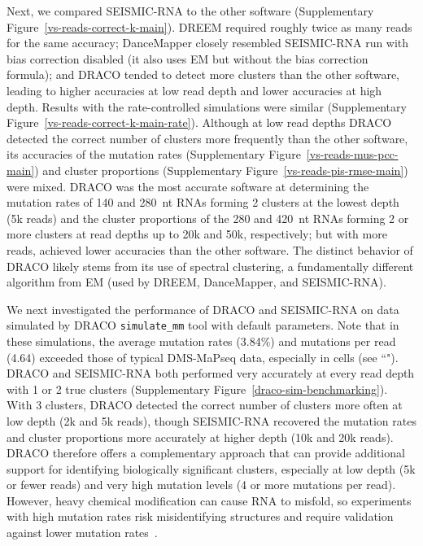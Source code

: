 \documentclass[unnumsec,webpdf,contemporary,large]{oup-authoring-template}%
\theoremstyle{thmstyleone}%
\theoremstyle{thmstyletwo}%
\theoremstyle{thmstylethree}%
\begin{document}
Next, we compared SEISMIC-RNA to the other software (Supplementary Figure~\ref{vs-reads-correct-k-main}).
DREEM required roughly twice as many reads for the same accuracy; DanceMapper closely resembled SEISMIC-RNA run with bias correction disabled (it also uses EM but without the bias correction formula); and DRACO tended to detect more clusters than the other software, leading to higher accuracies at low read depth and lower accuracies at high depth.
Results with the rate-controlled simulations were similar (Supplementary Figure~\ref{vs-reads-correct-k-main-rate}).
Although at low read depths DRACO detected the correct number of clusters more frequently than the other software, its accuracies of the mutation rates (Supplementary Figure~\ref{vs-reads-mus-pcc-main}) and cluster proportions (Supplementary Figure~\ref{vs-reads-pis-rmse-main}) were mixed.
DRACO was the most accurate software at determining the mutation rates of 140 and 280~nt RNAs forming 2 clusters at the lowest depth (5k reads) and the cluster proportions of the 280 and 420~nt RNAs forming 2 or more clusters at read depths up to 20k and 50k, respectively; but with more reads, achieved lower accuracies than the other software.
The distinct behavior of DRACO likely stems from its use of spectral clustering, a fundamentally different algorithm from EM (used by DREEM, DanceMapper, and SEISMIC-RNA).

We next investigated the performance of DRACO and SEISMIC-RNA on data simulated by DRACO \verb|simulate_mm| tool with default parameters.
Note that in these simulations, the average mutation rates (3.84\%) and mutations per read (4.64) exceeded those of typical DMS-MaPseq data, especially in cells (see ``").
DRACO and SEISMIC-RNA both performed very accurately at every read depth with 1 or 2 true clusters (Supplementary Figure~\ref{draco-sim-benchmarking}).
With 3 clusters, DRACO detected the correct number of clusters more often at low depth (2k and 5k reads), though SEISMIC-RNA recovered the mutation rates and cluster proportions more accurately at higher depth (10k and 20k reads).
DRACO therefore offers a complementary approach that can provide additional support for identifying biologically significant clusters, especially at low depth (5k or fewer reads) and very high mutation levels (4 or more mutations per read).
However, heavy chemical modification can cause RNA to misfold, so experiments with high mutation rates risk misidentifying structures and require validation against lower mutation rates~\cite{Arnold2025}.
\end{document}

